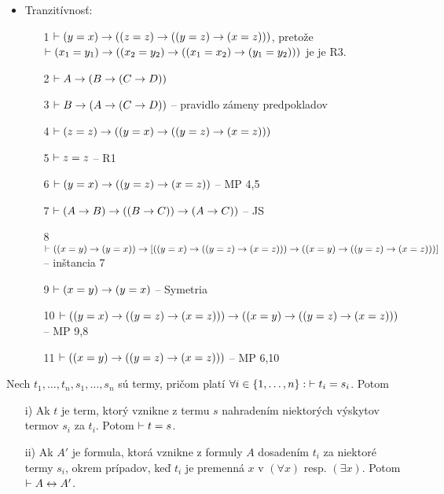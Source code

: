 \begin{dokaz}
\begin{itemize}
    \item Tranzitívnosť:
        \begin{itemize}
            \item[1] $\vdash (y=x) \rightarrow ((z=z) \rightarrow
                ((y=z) \rightarrow (x=z)))$, pretože \\
                $\vdash (x_1 = y_1) \rightarrow ((x_2=y_2) \rightarrow
                 ((x_1=x_2) \rightarrow (y_1=y_2)))$ je je R3.
            \item[2] $\vdash A \rightarrow (B \rightarrow (C \rightarrow D))$
            \item[3] $\vdash B \rightarrow (A \rightarrow (C \rightarrow D))$
                -- pravidlo zámeny predpokladov
            \item[4] $\vdash (z=z) \rightarrow ((y=x) \rightarrow ((y=z) \rightarrow
                (x=z)))$
            \item[5] $\vdash z=z$ -- R1
            \item[6] $\vdash (y=x) \rightarrow ((y=z) \rightarrow (x=z))$
                -- MP 4,5
            \item[7] $\vdash (A \rightarrow B) \rightarrow ((B \rightarrow
                C)) \rightarrow (A \rightarrow C))$ -- JS
            \item[8] $\vdash ((x=y) \rightarrow (y=x)) \rightarrow [
                ((y=x) \rightarrow ((y=z) \rightarrow (x=z))) \rightarrow
                ((x=y) \rightarrow ((y=z) \rightarrow (x=z)))]$ -- inštancia 7
            \item[9] $\vdash (x=y) \rightarrow (y=x)$ -- Symetria
            \item[10] $\vdash
                ((y=x) \rightarrow ((y=z) \rightarrow (x=z))) \rightarrow
                ((x=y) \rightarrow ((y=z) \rightarrow (x=z)))$ -- MP 9,8
            \item[11] $\vdash ((x=y) \rightarrow ((y=z) \rightarrow (x=z)))$ -- MP 6,10
        \end{itemize}
\end{itemize}
\end{dokaz}

\begin{veta}
    Nech $t_1,\ldots,t_n,s_1,\ldots,s_n$ sú termy, pričom platí
        $\forall i \in \{1,\dots,n\}:\; \vdash t_i = s_i$.
    Potom
    \begin{itemize}
    \item[i)] Ak $t$ je term, ktorý vznikne z termu $s$ nahradením
        niektorých výskytov termov $s_i$ za $t_i$. Potom 
        $\vdash t=s$.
    \item[ii)] Ak $A'$ je formula, ktorá vznikne z formuly $A$
    dosadením $t_i$ za niektoré termy $s_i$, okrem prípadov, keď
    $t_i$ je premenná $x$ v $(\forall x)$ resp. $(\exists x)$. Potom
    $\vdash A \leftrightarrow A'$.
    \end{itemize}
\end{veta}


